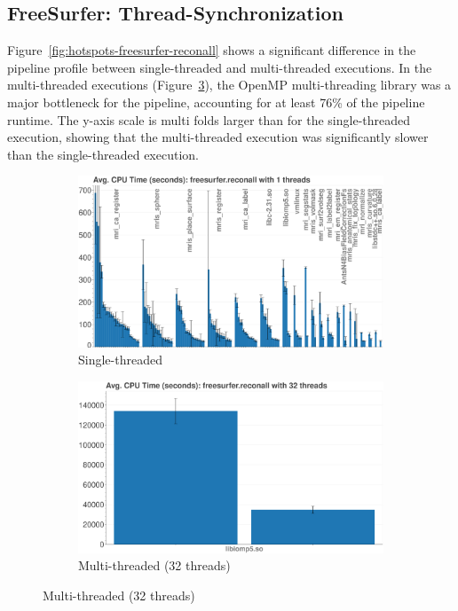 \documentclass[conference]{IEEEtran}
\begin{document}
\subsection{FreeSurfer: Thread-Synchronization}
Figure~\ref{fig:hotspots-freesurfer-reconall} shows a significant difference in the pipeline profile between single-threaded and multi-threaded executions. In the multi-threaded executions (Figure~\ref{subfig:hotspots-freesurfer-reconall-32threads}), the OpenMP multi-threading library was a major bottleneck for the pipeline, accounting for at least 76\% of the pipeline runtime. The y-axis scale is multi folds larger than for the single-threaded execution, showing that the multi-threaded execution was significantly slower than the single-threaded execution.
					
\begin{figure}
	\centering
	\begin{subfigure}[t]{0.49\textwidth}
		\caption{Single-threaded}
		\label{subfig:hotspots-freesurfer-reconall-1thread}
		\includegraphics[width=\textwidth]{figures/hotspots-1threads-freesurfer-reconall-simple.png}
	\end{subfigure}
	\begin{subfigure}[t]{0.49\textwidth}
		\caption{Multi-threaded (32 threads)}
		\label{subfig:hotspots-freesurfer-reconall-32threads}
		\includegraphics[width=\textwidth]{figures/hotspots-32threads-freesurfer-reconall-simple.png}

\end{subfigure}
\end{figure}
\end{document}
